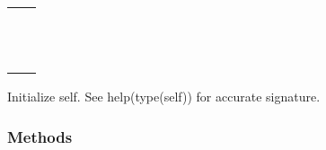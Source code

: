 \documentclass[letterpaper,10pt,english]{sphinxmanual}
\begin{document}
\begin{fulllineitems}
\begin{savenotes}\sphinxattablestart
\centering
\begin{tabulary}{\linewidth}[t]{|T|T|}
\hline

&\\
\hline
{}
&\\
\hline
{}
&\\
\hline
{}
&\\
\hline
{}
&\\
\hline
{}
&\\
\hline
{}
&\\
\hline
{}
&\\
\hline
{}
&\\
\hline
{}
&\\
\hline
{}
&\\
\hline
{}
&\\
\hline
{}
&\\
\hline
\end{tabulary}
\par
\sphinxattableend\end{savenotes}

\begin{fulllineitems}
\label{\detokenize{generated/sdapy.model_fitters.fit_model:sdapy.model_fitters.fit_model.__init__}}
Initialize self.  See help(type(self)) for accurate signature.

\end{fulllineitems}

\subsubsection*{Methods}


\begin{savenotes}\sphinxatlongtablestart\begin{longtable}[c]{}
\hline


\end{longtable}
\end{savenotes}
\end{fulllineitems}
\end{document}
